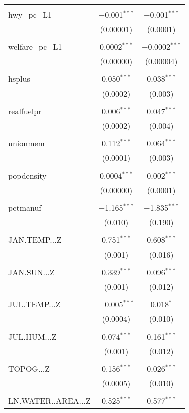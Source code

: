 \begin{table}[!htbp]
\begin{tabular}{@{\extracolsep{5pt}}lcc}
  & & \\ 
 hwy\_pc\_L1 & $-$0.001$^{***}$ & $-$0.001$^{***}$ \\ 
  & (0.00001) & (0.0001) \\ 
  & & \\ 
 welfare\_pc\_L1 & 0.0002$^{***}$ & $-$0.0002$^{***}$ \\ 
  & (0.00000) & (0.00004) \\ 
  & & \\ 
 hsplus & 0.050$^{***}$ & 0.038$^{***}$ \\ 
  & (0.0002) & (0.003) \\ 
  & & \\ 
 realfuelpr & 0.006$^{***}$ & 0.047$^{***}$ \\ 
  & (0.0002) & (0.004) \\ 
  & & \\ 
 unionmem & 0.112$^{***}$ & 0.064$^{***}$ \\ 
  & (0.0001) & (0.003) \\ 
  & & \\ 
 popdensity & 0.0004$^{***}$ & 0.002$^{***}$ \\ 
  & (0.00000) & (0.0001) \\ 
  & & \\ 
 pctmanuf & $-$1.165$^{***}$ & $-$1.835$^{***}$ \\ 
  & (0.010) & (0.190) \\ 
  & & \\ 
 JAN.TEMP...Z & 0.751$^{***}$ & 0.608$^{***}$ \\ 
  & (0.001) & (0.016) \\ 
  & & \\ 
 JAN.SUN...Z & 0.339$^{***}$ & 0.096$^{***}$ \\ 
  & (0.001) & (0.012) \\ 
  & & \\ 
 JUL.TEMP...Z & $-$0.005$^{***}$ & 0.018$^{*}$ \\ 
  & (0.0004) & (0.010) \\ 
  & & \\ 
 JUL.HUM...Z & 0.074$^{***}$ & 0.161$^{***}$ \\ 
  & (0.001) & (0.012) \\ 
  & & \\ 
 TOPOG...Z & 0.156$^{***}$ & 0.026$^{***}$ \\ 
  & (0.0005) & (0.010) \\ 
  & & \\ 
 LN.WATER..AREA...Z & 0.525$^{***}$ & 0.577$^{***}$ \\ 

\end{tabular}
\end{table}
